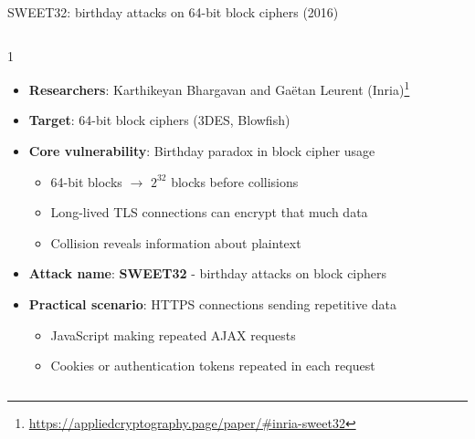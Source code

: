 \ifdefined\PRESENTATION\else\PassOptionsToClass{handout}{beamer}\fi\documentclass[aspectratio=169, lualatex]{beamer}
\begin{document}
\begin{frame}{SWEET32: birthday attacks on 64-bit block ciphers (2016)}
	\begin{columns}[c]
		\begin{column}{1\textwidth}
			\begin{itemize}
				\item \textbf{Researchers}: Karthikeyan Bhargavan and Ga\"etan Leurent (Inria)\footnote{\url{https://appliedcryptography.page/paper/\#inria-sweet32}}
				\item \textbf{Target}: 64-bit block ciphers (3DES, Blowfish)
				\item \textbf{Core vulnerability}: Birthday paradox in block cipher usage
				      \begin{itemize}
					      \item 64-bit blocks $\rightarrow$ $2^{32}$ blocks before collisions
					      \item Long-lived TLS connections can encrypt that much data
					      \item Collision reveals information about plaintext
				      \end{itemize}
				\item \textbf{Attack name}: \textbf{SWEET32} - birthday attacks on block ciphers
				\item \textbf{Practical scenario}: HTTPS connections sending repetitive data
				      \begin{itemize}
					      \item JavaScript making repeated AJAX requests
					      \item Cookies or authentication tokens repeated in each request
				      \end{itemize}
			\end{itemize}
		\end{column}
	\end{columns}
\end{frame}
\end{document}
